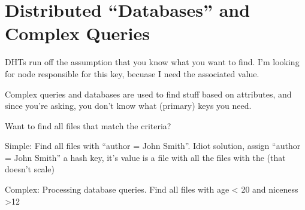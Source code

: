 





\section{Distributed ``Databases'' and Complex Queries}


DHTs run off the assumption that you know what you want to find.
I'm looking for node responsible for this key, becuase I need the associated value.

Complex queries and databases are used to find stuff based on attributes, and since you're asking, you don't know what (primary) keys you need.


Want to find all files that match the criteria?





Simple: Find all files with ``author = John Smith''.  Idiot solution, assign ``author = John Smith'' a hash key,  it's value is a file with all the files with the (that doesn't scale) 


Complex: Processing database queries.   Find all files with age < 20 and niceness >12

